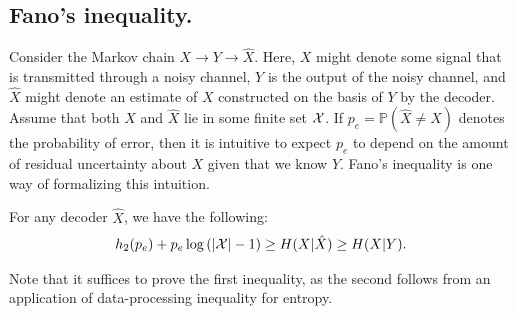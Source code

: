             \subsection{Fano's inequality.} 
            Consider the Markov chain $X \rightarrow Y \rightarrow \hat{X}$. Here, $X$ might denote some signal that is transmitted through a noisy channel, $Y$ is the output of the noisy channel, and $\hat{X}$ might denote an estimate of $X$ constructed on the basis of $Y$ by the decoder.  Assume that both $X$ and $\hat{X}$ lie in some finite set $\mathcal{X}$. If $p_e = \mathbb{P}(\hat{X} \neq X)$ denotes the probability of error, then it is intuitive to expect $p_e$ to depend on the amount of residual uncertainty about $X$  given that we know $Y$. Fano's inequality is one way of formalizing this intuition. 
            \begin{proposition}
                \label{prop:fano} For any decoder $\hat{X}$, we have the following: 
                \begin{align}
                    h_2(p_e) + p_e \log \left( |\mathcal{X}|-1\right)  \geq H(X|\hat{X}) \geq H(X|Y). 
                \end{align}
            \end{proposition}
            \begin{remark}
                Note that it suffices to prove the first inequality, as the second follows from an application of data-processing inequality for entropy. 
            \end{remark}

